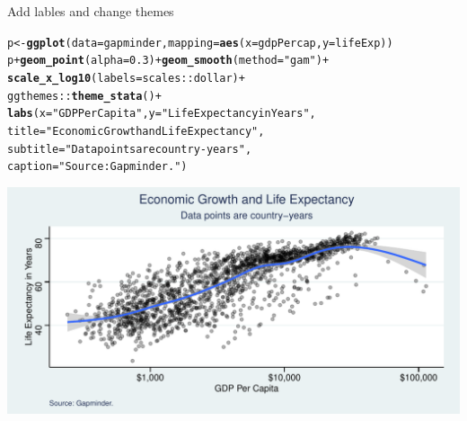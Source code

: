 \documentclass[10pt,handout]{beamer}\usepackage[]{graphicx}\usepackage[]{color}
\makeatletter
\def\maxwidth{ %
  \ifdim\Gin@nat@width>\linewidth
    \linewidth
  \else
    \Gin@nat@width
  \fi
}
\newcommand{\hlnum}[1]{\textcolor[rgb]{0.686,0.059,0.569}{#1}}%
\newcommand{\hlstr}[1]{\textcolor[rgb]{0.192,0.494,0.8}{#1}}%
\newcommand{\hlopt}[1]{\textcolor[rgb]{0,0,0}{#1}}%
\newcommand{\hlstd}[1]{\textcolor[rgb]{0.345,0.345,0.345}{#1}}%
\newcommand{\hlkwb}[1]{\textcolor[rgb]{0.69,0.353,0.396}{#1}}%
\newcommand{\hlkwc}[1]{\textcolor[rgb]{0.333,0.667,0.333}{#1}}%
\newcommand{\hlkwd}[1]{\textcolor[rgb]{0.737,0.353,0.396}{\textbf{#1}}}%
\newenvironment{kframe}{%
 \def\at@end@of@kframe{}%
 \ifinner\ifhmode%
  \def\at@end@of@kframe{\end{minipage}}%
  \begin{minipage}{\columnwidth}%
 \fi\fi%
 \def\FrameCommand##1{\hskip\@totalleftmargin \hskip-\fboxsep
 \colorbox{shadecolor}{##1}\hskip-\fboxsep
     \hskip-\linewidth \hskip-\@totalleftmargin \hskip\columnwidth}%
 \MakeFramed {\advance\hsize-\width
   \@totalleftmargin\z@ \linewidth\hsize
   \@setminipage}}%
 {\par\unskip\endMakeFramed%
 \at@end@of@kframe}
\newenvironment{knitrout}{}{} %
\makeatother
\begin{document}
\begin{frame}[fragile]{Add lables and change themes}
\begin{knitrout}\tiny
{}\color{fgcolor}\begin{kframe}
\begin{alltt}
\hlstd{p} \hlkwb{<-} \hlkwd{ggplot}\hlstd{(}\hlkwc{data} \hlstd{= gapminder,} \hlkwc{mapping} \hlstd{=} \hlkwd{aes}\hlstd{(}\hlkwc{x} \hlstd{= gdpPercap,} \hlkwc{y}\hlstd{=lifeExp))}
\hlstd{p} \hlopt{+} \hlkwd{geom_point}\hlstd{(}\hlkwc{alpha} \hlstd{=} \hlnum{0.3}\hlstd{)} \hlopt{+} \hlkwd{geom_smooth}\hlstd{(}\hlkwc{method} \hlstd{=} \hlstr{"gam"}\hlstd{)} \hlopt{+}
    \hlkwd{scale_x_log10}\hlstd{(}\hlkwc{labels} \hlstd{= scales}\hlopt{::}\hlstd{dollar)} \hlopt{+}
    \hlstd{ggthemes}\hlopt{::}\hlkwd{theme_stata}\hlstd{()} \hlopt{+}
    \hlkwd{labs}\hlstd{(}\hlkwc{x} \hlstd{=} \hlstr{"GDP Per Capita"}\hlstd{,} \hlkwc{y} \hlstd{=} \hlstr{"Life Expectancy in Years"}\hlstd{,}
        \hlkwc{title} \hlstd{=} \hlstr{"Economic Growth and Life Expectancy"}\hlstd{,}
        \hlkwc{subtitle} \hlstd{=} \hlstr{"Data points are country-years"}\hlstd{,}
        \hlkwc{caption} \hlstd{=} \hlstr{"Source: Gapminder."}\hlstd{)}
\end{alltt}
\end{kframe}

{\centering \includegraphics[width=\maxwidth]{figure/unnamed-chunk-15-1} 

}


\end{knitrout}
\end{frame}
\end{document}
